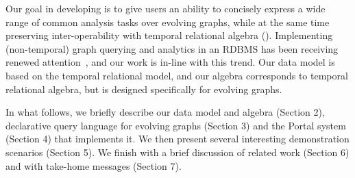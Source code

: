 Our goal in developing \tga is to give users an ability to concisely
express a wide range of common analysis tasks over evolving graphs,
while at the same time preserving inter-operability with temporal
relational algebra (\tra).  Implementing (non-temporal) graph querying
and analytics in an RDBMS has been receiving renewed
attention~\cite{DBLP:conf/sigmod/AbergerTOR16,DBLP:conf/sigmod/SunFSKHX15,DBLP:journals/pvldb/Xirogiannopoulos15},
and our work is in-line with this trend. Our data model is based on
the temporal relational model, and our algebra corresponds to temporal
relational algebra, but is designed specifically for evolving graphs.

In what follows, we briefly describe our data model and algebra (Section 2), declarative query
language for evolving graphs (Section 3) and the Portal system
(Section 4) that implements it. We then present several
interesting demonstration scenarios (Section 5). We finish
with a brief discussion of related work (Section 6) and with
take-home messages (Section 7).


